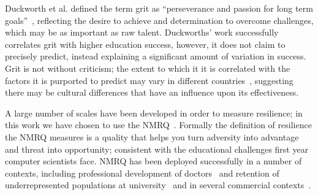 \documentclass[sigconf]{acmart}
\begin{document}
Duckworth et al. defined the term grit as ``perseverance and passion for long term goals''~\cite{Duckworth2007}, reflecting the desire to achieve and determination to overcome challenges, which may be as important as raw talent. Duckworths' work successfully correlates grit with higher education success, however, it does not claim to precisely predict, instead explaining a significant amount of variation in success. Grit is not without criticism; the extent to which it it is correlated with the factors it is purported to predict may vary in different countries~\cite{Datu2016, Tyumeneva2017}, suggesting there may be cultural differences that have an influence upon its effectiveness. 

A large number of scales have been developed in order to measure resilience; in this work we have chosen to use the NMRQ~\cite{Clarke2010}. Formally the definition of resilience the NMRQ measures is a quality that helps you turn adversity into advantage and threat into opportunity; consistent with the educational challenges first year computer scientists face. NMRQ has been deployed successfully in a number of contexts, including professional development of doctors~\cite{Tregoningg251} and retention of underrepresented populations at university~\cite{Daniels2015} and in several commercial contexts~\cite{Clarke2010}. 


\end{document}
